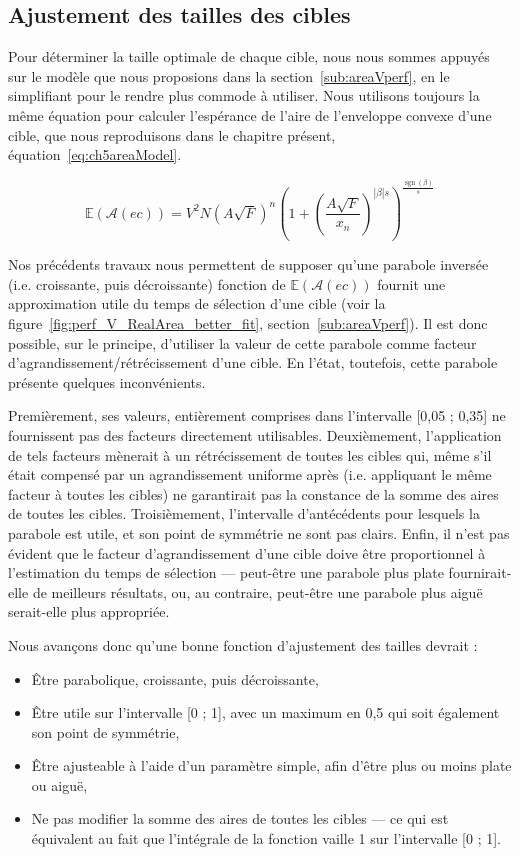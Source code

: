 	\subsection{Ajustement des tailles des cibles}
	Pour déterminer la taille optimale de chaque cible, nous nous sommes appuyés sur le modèle que nous proposions dans la section~\ref{sub:areaVperf}, en le simplifiant pour le rendre plus commode à utiliser. Nous utilisons toujours la même équation pour calculer l'espérance de l'aire de l'enveloppe convexe d'une cible, que nous reproduisons dans le chapitre présent, équation~\ref{eq:ch5areaModel}.
	
	\begin{equation}
		\mathbb{E}(\mathcal{A}(ec)) = V^{2}N \left( A\sqrt{F} \right)^n \left(1+\left(\frac{A\sqrt{F}}{x_n}\right)^{|\beta|s}\right)^{\frac{\operatorname{sgn}(\beta)}{s}}
		\label{eq:ch5areaModel}
	\end{equation}
	
	Nos précédents travaux nous permettent de supposer qu'une parabole \og inversée \fg{} (i.e. croissante, puis décroissante) fonction de $\mathbb{E}(\mathcal{A}(ec))$ fournit une approximation utile du temps de sélection d'une cible (voir la figure~\ref{fig:perf_V_RealArea_better_fit}, section~\ref{sub:areaVperf}). Il est donc possible, sur le principe, d'utiliser la valeur de cette parabole comme facteur d'agrandissement/rétrécissement d'une cible. En l'état, toutefois, cette parabole présente quelques inconvénients.
	
	Premièrement, ses valeurs, entièrement comprises dans l'intervalle [0,05 ; 0,35] ne fournissent pas des facteurs directement utilisables. Deuxièmement, l'application de tels facteurs mènerait à un rétrécissement de toutes les cibles qui, même s'il était compensé par un agrandissement uniforme après (i.e. appliquant le même facteur à toutes les cibles) ne garantirait pas la constance de la somme des aires de toutes les cibles. Troisièmement, l'intervalle d'antécédents pour lesquels la parabole est utile, et son point de symmétrie ne sont pas clairs. Enfin, il n'est pas évident que le facteur d'agrandissement d'une cible doive être proportionnel à l'estimation du temps de sélection --- peut-être une parabole plus \og plate \fg{} fournirait-elle de meilleurs résultats, ou, au contraire, peut-être une parabole plus \og aiguë \fg{} serait-elle plus appropriée.
	
	Nous avançons donc qu'une bonne fonction d'ajustement des tailles devrait :
	
	\begin{itemize}
		\item Être parabolique, croissante, puis décroissante,
		\item Être utile sur l'intervalle [0 ; 1], avec un maximum en 0,5 qui soit également son point de symmétrie,
		\item Être ajusteable à l'aide d'un paramètre simple, afin d'être plus ou moins plate ou aiguë,
		\item Ne pas modifier la somme des aires de toutes les cibles --- ce qui est équivalent au fait que l'intégrale de la fonction vaille 1 sur l'intervalle [0 ; 1].
	\end{itemize}
	
